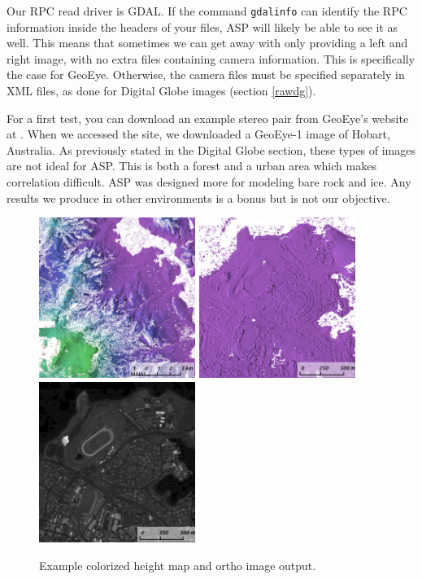 Our RPC read driver is GDAL. If the command \texttt{gdalinfo} can identify
the RPC information inside the headers of your files, ASP will likely
be able to see it as well. This means that sometimes we can get away
with only providing a left and right image, with no extra files
containing camera information. This is specifically the
case for GeoEye. Otherwise, the camera files must be specified 
separately in XML files, as done for Digital
Globe images (section \ref{rawdg}).  

For a first test, you can download an example stereo pair from GeoEye's
website at \cite{geoeye:samples}. When we accessed the site, we
downloaded a GeoEye-1 image of Hobart, Australia. As previously stated
in the Digital Globe section, these types of images are not ideal for
ASP. This is both a forest and a urban area which makes correlation
difficult. ASP was designed more for modeling bare rock and ice. Any
results we produce in other environments is a bonus but is not our
objective.

\begin{figure}[h!]
\centering
  \includegraphics[width=2.0in]{images/examples/geoeye/GeoEye_ContextRender_400px.png}
  \includegraphics[width=2.0in]{images/examples/geoeye/GeoEye_CloseUp_400px.png}
  \includegraphics[width=2.0in]{images/examples/geoeye/GeoEye_CloseUpDRG_400px.png}
\caption{Example colorized height map and ortho image output.}
\label{fig:geoeye-nomap-example}
\end{figure}

